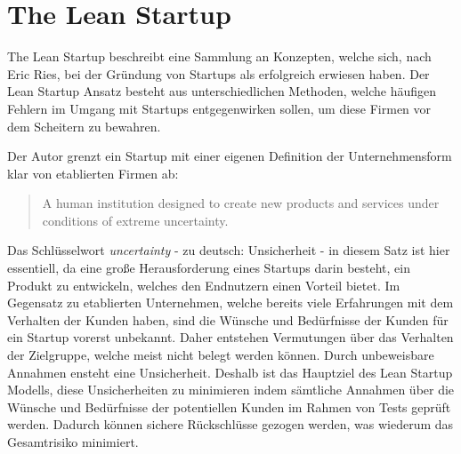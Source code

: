 \section{The Lean Startup}
\label{sec:LeanStartup}
The Lean Startup beschreibt eine Sammlung an Konzepten, welche sich, nach Eric Ries, bei der Gründung von Startups als erfolgreich erwiesen haben. Der Lean Startup Ansatz besteht aus unterschiedlichen Methoden, welche häufigen Fehlern im Umgang mit Startups entgegenwirken sollen, um diese Firmen vor dem Scheitern zu bewahren.

Der Autor grenzt ein Startup mit einer eigenen Definition der Unternehmensform klar von etablierten Firmen ab:
\begin{quote}
A human institution designed to create new products and services under conditions of extreme uncertainty. \cite{TheLeanStartup}
\end{quote}
Das Schlüsselwort \textit{uncertainty} - zu deutsch: Unsicherheit - in diesem Satz ist hier essentiell, da eine große Herausforderung eines Startups darin besteht, ein Produkt zu entwickeln, welches den Endnutzern einen Vorteil bietet. Im Gegensatz zu etablierten Unternehmen, welche bereits viele Erfahrungen mit dem Verhalten der Kunden haben, sind die Wünsche und Bedürfnisse der Kunden für ein Startup vorerst unbekannt. Daher entstehen Vermutungen über das Verhalten der Zielgruppe, welche meist nicht belegt werden können. Durch unbeweisbare Annahmen ensteht eine Unsicherheit. Deshalb ist das Hauptziel des Lean Startup Modells, diese Unsicherheiten zu minimieren indem sämtliche Annahmen über die Wünsche und Bedürfnisse der potentiellen Kunden im Rahmen von Tests geprüft werden. Dadurch können sichere Rückschlüsse gezogen werden, was wiederum das Gesamtrisiko minimiert.

